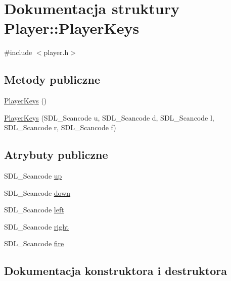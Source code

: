 \hypertarget{struct_player_1_1_player_keys}{}\section{Dokumentacja struktury Player\+:\+:Player\+Keys}
\label{struct_player_1_1_player_keys}


{\ttfamily \#include $<$player.\+h$>$}

\subsection*{Metody publiczne}
\begin{DoxyCompactItemize}
\item 
\hyperlink{struct_player_1_1_player_keys_a56a56f4201c50a48bb847971c94ca4b1}{Player\+Keys} ()
\item 
\hyperlink{struct_player_1_1_player_keys_abfa5fbc24fae22b69a060b7ce5812aab}{Player\+Keys} (S\+D\+L\+\_\+\+Scancode u, S\+D\+L\+\_\+\+Scancode d, S\+D\+L\+\_\+\+Scancode l, S\+D\+L\+\_\+\+Scancode r, S\+D\+L\+\_\+\+Scancode f)
\end{DoxyCompactItemize}
\subsection*{Atrybuty publiczne}
\begin{DoxyCompactItemize}
\item 
S\+D\+L\+\_\+\+Scancode \hyperlink{struct_player_1_1_player_keys_a943bcfbd15d886d3d2a397343717dd4f}{up}
\item 
S\+D\+L\+\_\+\+Scancode \hyperlink{struct_player_1_1_player_keys_a57aab79d509ab35da6ee806f92299679}{down}
\item 
S\+D\+L\+\_\+\+Scancode \hyperlink{struct_player_1_1_player_keys_a963bc2b65a3e864cb863a0ed5d77a233}{left}
\item 
S\+D\+L\+\_\+\+Scancode \hyperlink{struct_player_1_1_player_keys_a0ed2777f9a657033b9ceb04302fea7c5}{right}
\item 
S\+D\+L\+\_\+\+Scancode \hyperlink{struct_player_1_1_player_keys_ae9a752c12df2b347234bb7acefe93ed0}{fire}
\end{DoxyCompactItemize}


\subsection{Dokumentacja konstruktora i destruktora}
\hypertarget{struct_player_1_1_player_keys_a56a56f4201c50a48bb847971c94ca4b1}{}
